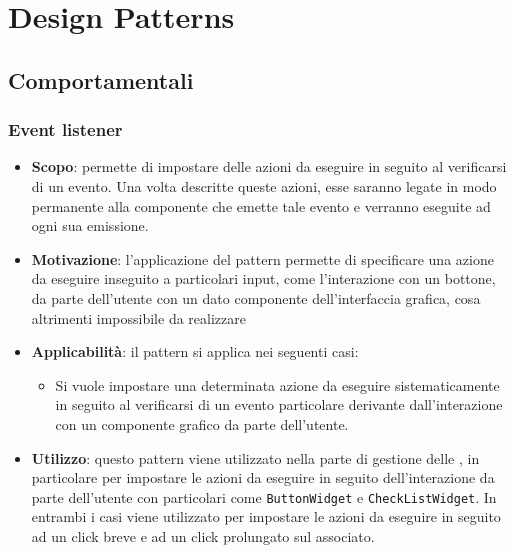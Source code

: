 \section{Design Patterns}

\subsection{Comportamentali}
\subsubsection{Event listener}
\begin{itemize}
	\item \textbf{Scopo}: permette di impostare delle azioni da eseguire in seguito al verificarsi di un evento. Una volta descritte queste azioni, esse saranno legate in modo permanente alla componente che emette tale evento e verranno eseguite ad ogni sua emissione.
	\item \textbf{Motivazione}: l'applicazione del pattern  permette di specificare una azione da eseguire inseguito a particolari input, come l'interazione con un bottone, da parte dell'utente con un dato componente dell'interfaccia grafica, cosa altrimenti impossibile da realizzare
	\item \textbf{Applicabilità}: il pattern  si applica nei seguenti casi:
		  \begin{itemize}
		  		\item Si vuole impostare una determinata azione da eseguire sistematicamente in seguito al verificarsi di un evento particolare derivante dall'interazione con un componente grafico da parte dell'utente.
		  \end{itemize}
	\item \textbf{Utilizzo}: questo pattern viene utilizzato nella parte di gestione delle , in particolare per impostare le azioni da eseguire in seguito dell'interazione da parte dell'utente con particolari  come \texttt{ButtonWidget} e \texttt{CheckListWidget}. In entrambi i casi viene utilizzato per impostare le azioni da eseguire in seguito ad un click breve e ad un click prolungato sul  associato.
\end{itemize}

